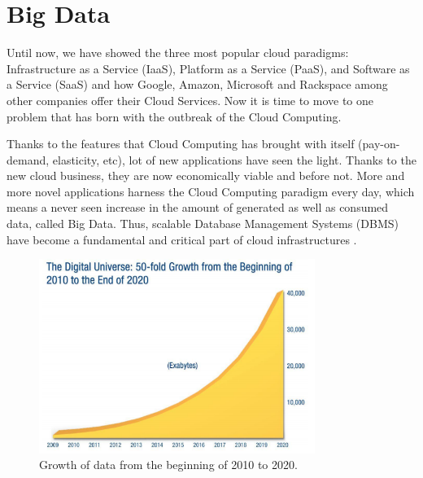 \section{Big Data}


Until now, we have showed the three most popular cloud paradigms: Infrastructure as a Service (IaaS), Platform as a Service (PaaS), and Software as a Service (SaaS) and how Google, Amazon, Microsoft and Rackspace among other companies offer their Cloud Services. Now it is time to move to one problem that has born with the outbreak of the Cloud Computing.
\par
Thanks to the features that Cloud Computing has brought with itself (pay-on-demand, elasticity, etc), lot of new applications have seen the light. Thanks to the new cloud business, they are now economically viable and before not. More and more novel applications harness the Cloud Computing paradigm every day, which means a never seen increase in the amount of generated as well as consumed data, called Big Data. Thus, scalable Database Management Systems (DBMS) have become a fundamental and critical part of cloud infrastructures \cite{agrawal2010big}.

\begin{figure}[htb]
\centering
\includegraphics[width=0.8\textwidth]{./images/bigData.png}
\caption{Growth of data from the beginning of 2010 to 2020.} 
\label{fig:bigData}
\end{figure}

